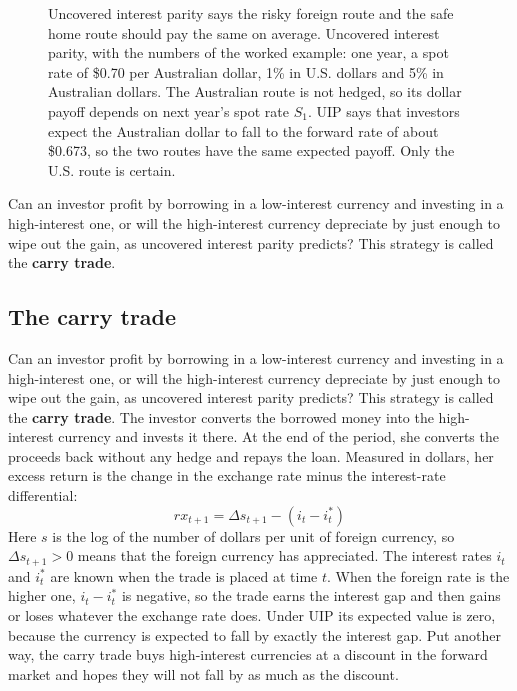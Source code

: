 \begin{figure}[htbp]
{%
}
\caption{Uncovered interest parity says the risky foreign route and the safe home route should pay the same on average. Uncovered interest parity, with the numbers of the worked example: one year, a spot rate of \$0.70 per Australian dollar, 1\% in U.S. dollars and 5\% in Australian dollars. The Australian route is not hedged, so its dollar payoff depends on next year's spot rate $S_1$. UIP says that investors expect the Australian dollar to fall to the forward rate of about \$0.673, so the two routes have the same expected payoff. Only the U.S. route is certain.}
\label{fig:06-uip}
\end{figure}


Can an investor profit by borrowing in a low-interest currency and investing in a high-interest one, or will the high-interest currency depreciate by just enough to wipe out the gain, as uncovered interest parity predicts? This strategy is called the \textbf{carry trade}.
\subsection{The carry trade}

Can an investor profit by borrowing in a low-interest currency and investing in a high-interest one, or will the high-interest currency depreciate by just enough to wipe out the gain, as uncovered interest parity predicts? This strategy is called the \textbf{carry trade}. The investor converts the borrowed money into the high-interest currency and invests it there. At the end of the period, she converts the proceeds back without any hedge and repays the loan. Measured in dollars, her excess return is the change in the exchange rate minus the interest-rate differential:
\begin{equation}
  rx_{t+1} = \Delta s_{t+1} - (i_t - i^*_t)
  \label{eq:06-carry}
\end{equation}
Here $s$ is the log of the number of dollars per unit of foreign currency, so $\Delta s_{t+1} > 0$ means that the foreign currency has appreciated. The interest rates $i_t$ and $i^*_t$ are known when the trade is placed at time $t$. When the foreign rate is the higher one, $i_t - i^*_t$ is negative, so the trade earns the interest gap and then gains or loses whatever the exchange rate does. Under UIP its expected value is zero, because the currency is expected to fall by exactly the interest gap. Put another way, the carry trade buys high-interest currencies at a discount in the forward market and hopes they will not fall by as much as the discount.

